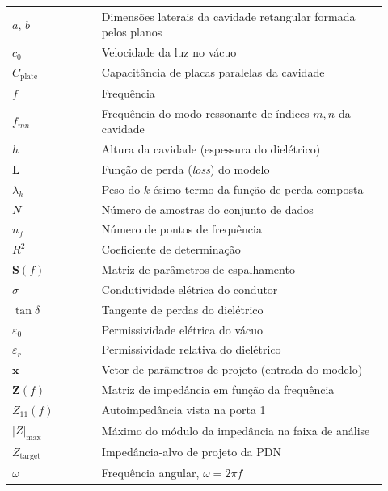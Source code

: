 

\begin{listasimb}

\begin{longtable}[l]{p{0.22\linewidth}p{0.70\linewidth}}
$a$, $b$ & Dimensões laterais da cavidade retangular formada pelos planos\\
$c_0$ & Velocidade da luz no vácuo\\
$C_{\text{plate}}$ & Capacitância de placas paralelas da cavidade\\
$f$ & Frequência\\
$f_{mn}$ & Frequência do modo ressonante de índices $m,n$ da cavidade\\
$h$ & Altura da cavidade (espessura do dielétrico)\\
$\mathbf{L}$ & Função de perda (\textit{loss}) do modelo\\
$\lambda_k$ & Peso do $k$-ésimo termo da função de perda composta\\
$N$ & Número de amostras do conjunto de dados\\
$n_f$ & Número de pontos de frequência\\
$R^2$ & Coeficiente de determinação\\
$\mathbf{S}(f)$ & Matriz de parâmetros de espalhamento\\
$\sigma$ & Condutividade elétrica do condutor\\
$\tan\delta$ & Tangente de perdas do dielétrico\\
$\varepsilon_0$ & Permissividade elétrica do vácuo\\
$\varepsilon_r$ & Permissividade relativa do dielétrico\\
$\mathbf{x}$ & Vetor de parâmetros de projeto (entrada do modelo)\\
$\mathbf{Z}(f)$ & Matriz de impedância em função da frequência\\
$Z_{11}(f)$ & Autoimpedância vista na porta 1\\
$|Z|_{\max}$ & Máximo do módulo da impedância na faixa de análise\\
$Z_{\text{target}}$ & Impedância-alvo de projeto da PDN\\
$\omega$ & Frequência angular, $\omega = 2\pi f$\\
\end{longtable}

\end{listasimb}

